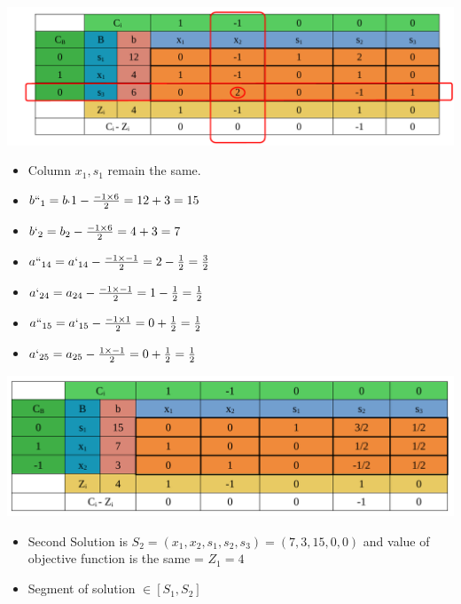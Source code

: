 \vspace{0.15cm}



\begin{center}
    \includegraphics{Chapters/Simplexe/EX/EX4/ex4.4.pdf}
\end{center}

\vspace{0.15cm}
\begin{itemize}

 \item Column \(x_1 , s_1\) remain the same.
 \item \(b``_{1} = b_`{1} - \frac{-1\times6}{2} = 12 + 3  = 15\)
 \item \(b`_{2} = b_{2} - \frac{-1\times6}{2} = 4 + 3  = 7\)
 \item \(a``_{14} = a`_{14} - \frac{-1\times-1}{2} = 2 - \frac{1}{2}  = \frac{3}{2}\)
 \item \(a`_{24} = a_{24} - \frac{-1\times-1}{2} = 1 - \frac{1}{2}  = \frac{1}{2}\)
 \item \(a``_{15} = a`_{15} - \frac{-1\times1}{2} = 0 + \frac{1}{2}  = \frac{1}{2}\)
 \item \(a`_{25} = a_{25} - \frac{1\times-1}{2} = 0 + \frac{1}{2}  = \frac{1}{2}\)

\end{itemize}

\vspace{0.25cm}


\begin{center}
    \includegraphics{Chapters/Simplexe/EX/EX4/ex4.5.pdf}
\end{center}

\begin{itemize}
    \item Second Solution is \(S_2 = (x_1,x_2,s_1,s_2,s_3) = (7,3,15,0,0)\) and value of objective function is the same = \(Z_1 = 4\)
    \item Segment of solution \(\in[S_1,S_2]\) 
\end{itemize}

